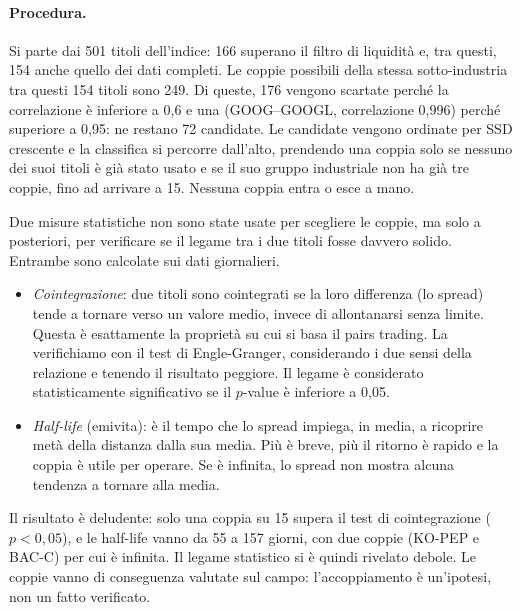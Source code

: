 \documentclass[11pt,a4paper]{article}
\begin{document}
\paragraph{Procedura.} Si parte dai 501 titoli dell'indice: 166 superano il filtro di liquidità e, tra questi, 154 anche quello dei dati completi. Le coppie possibili della stessa sotto-industria tra questi 154 titoli sono 249. Di queste, 176 vengono scartate perché la correlazione è inferiore a 0,6 e una (GOOG--GOOGL, correlazione 0,996) perché superiore a 0,95: ne restano 72 candidate. Le candidate vengono ordinate per SSD crescente e la classifica si percorre dall'alto, prendendo una coppia solo se nessuno dei suoi titoli è già stato usato e se il suo gruppo industriale non ha già tre coppie, fino ad arrivare a 15. Nessuna coppia entra o esce a mano.

Due misure statistiche non sono state usate per scegliere le coppie, ma solo a posteriori, per verificare se il legame tra i due titoli fosse davvero solido. Entrambe sono calcolate sui dati giornalieri.
\begin{itemize}
  \item \emph{Cointegrazione}: due titoli sono cointegrati se la loro differenza (lo spread) tende a tornare verso un valore medio, invece di allontanarsi senza limite. Questa è esattamente la proprietà su cui si basa il pairs trading. La verifichiamo con il test di Engle-Granger, considerando i due sensi della relazione e tenendo il risultato peggiore. Il legame è considerato statisticamente significativo se il $p$-value è inferiore a 0,05.
  \item \emph{Half-life} (emivita): è il tempo che lo spread impiega, in media, a ricoprire metà della distanza dalla sua media. Più è breve, più il ritorno è rapido e la coppia è utile per operare. Se è infinita, lo spread non mostra alcuna tendenza a tornare alla media.
\end{itemize}
Il risultato è deludente: solo una coppia su 15 supera il test di cointegrazione ($p<0{,}05$), e le half-life vanno da 55 a 157 giorni, con due coppie (KO-PEP e BAC-C) per cui è infinita. Il legame statistico si è quindi rivelato debole. Le coppie vanno di conseguenza valutate sul campo: l'accoppiamento è un'ipotesi, non un fatto verificato.

\end{document}
